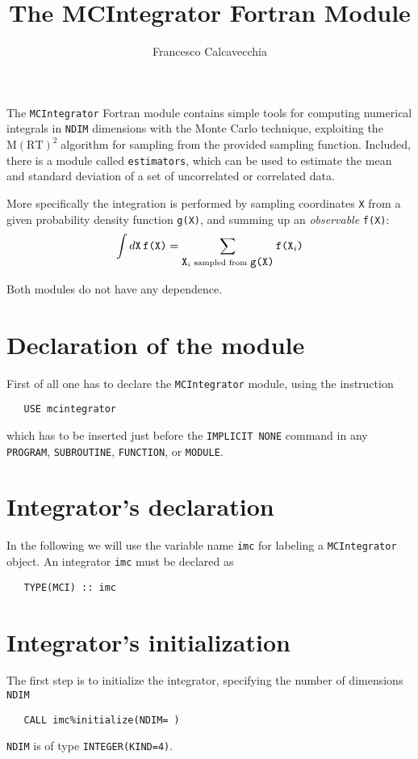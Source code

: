 \documentclass[11pt,a4paper,twoside]{article}
\title{The MCIntegrator Fortran Module}
\author{Francesco Calcavecchia}
\newcommand{\MRTWO}{$ \text{M}(\text{RT})^2 \;$}
\begin{document}
\maketitle

The \verb+MCIntegrator+ Fortran module contains simple tools for computing numerical integrals in \verb+NDIM+ dimensions with the Monte Carlo technique, exploiting the \MRTWO algorithm for sampling from the provided sampling function.
Included, there is a module called \verb+estimators+, which can be used to estimate the mean and standard deviation of a set of uncorrelated or correlated data.

More specifically the integration is performed by sampling coordinates \verb+X+ from a given probability density function \verb+g(X)+, and summing up an \emph{observable} \verb+f(X)+:
\begin{equation}
   \int d\verb+X+ \, \verb+f(X)+ = \sum_{\verb+X+_i \text{ sampled from } \verb+g(X)+} \verb+f(X+_i\verb+)+
\end{equation}

Both modules do not have any dependence.



\section{Declaration of the module}
First of all one has to declare the \verb+MCIntegrator+ module, using the instruction
\begin{verbatim}
   USE mcintegrator
\end{verbatim}
which has to be inserted just before the \verb+IMPLICIT NONE+ command in any \verb+PROGRAM+, \verb+SUBROUTINE+, \verb+FUNCTION+, or \verb+MODULE+.



\section{Integrator's declaration}
In the following we will use the variable name \verb+imc+ for labeling a \verb+MCIntegrator+ object.
An integrator \verb+imc+ must be declared as
\begin{verbatim}
   TYPE(MCI) :: imc
\end{verbatim}



\section{Integrator's initialization}
\label{sec:initialization}
The first step is to initialize the integrator, specifying the number of dimensions \verb+NDIM+
\begin{verbatim}
   CALL imc%initialize(NDIM= )
\end{verbatim}
\verb+NDIM+ is of type \verb+INTEGER(KIND=4)+.
\end{document}

